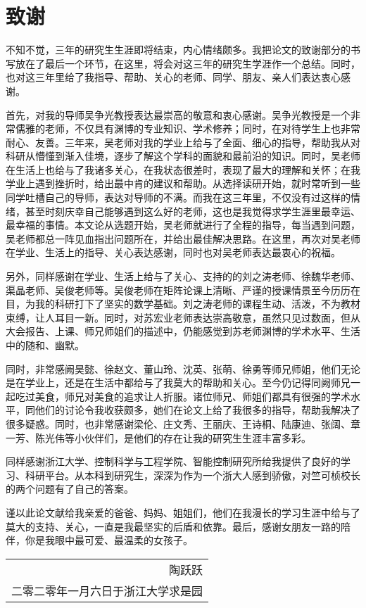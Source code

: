\chapter{致\texorpdfstring{\ZJUspace}{}谢}
	不知不觉，三年的研究生生涯即将结束，内心情绪颇多。我把论文的致谢部分的书写放在了最后一个环节，在这里，将会对这三年的研究生学涯作一个总结。同时，也对这三年里给了我指导、帮助、关心的老师、同学、朋友、亲人们表达衷心感谢。
	
	首先，对我的导师吴争光教授表达最崇高的敬意和衷心感谢。吴争光教授是一个非常儒雅的老师，不仅具有渊博的专业知识、学术修养；同时，在对待学生上也非常耐心、友善。三年来，吴老师对我的学业上给与了全面、细心的指导，帮助我从对科研从懵懂到渐入佳境，逐步了解这个学科的面貌和最前沿的知识。同时，吴老师在生活上也给与了我诸多关心，在我状态很差时，表现了最大的理解和关怀；在我学业上遇到挫折时，给出最中肯的建议和帮助。从选择读研开始，就时常听到一些同学吐槽自己的导师，表达对导师的不满。而我在这三年里，不仅没有过这样的情绪，甚至时刻庆幸自己能够遇到这么好的老师，这也是我觉得求学生涯里最幸运、最幸福的事情。本文论从选题开始，吴老师就进行了全程的指导，每当遇到问题，吴老师都总一阵见血指出问题所在，并给出最佳解决思路。在这里，再次对吴老师在学业、生活上的指导、关心表达感谢，同时也对吴老师表达最衷心的祝福。
	
	另外，同样感谢在学业、生活上给与了关心、支持的的刘之涛老师、徐魏华老师、渠晶老师、吴俊老师等。吴俊老师在矩阵论课上清晰、严谨的授课情景至今历历在目，为我的科研打下了坚实的数学基础。刘之涛老师的课程生动、活泼，不为教材束缚，让人耳目一新。同时，对苏宏业老师表达崇高敬意，虽然只见过数面，但从大会报告、上课、师兄师姐们的描述中，仍能感觉到苏老师渊博的学术水平、生活中的随和、幽默。
	
	同时，非常感阙昊懿、徐赵文、董山玲、沈英、张萌、徐勇等师兄师姐，他们无论是在学业上，还是在生活中都给与了我莫大的帮助和关心。至今仍记得同阙师兄一起吃过美食，师兄对美食的追求让人折服。诸位师兄、师姐们都具有很强的学术水平，同他们的讨论令我收获颇多，她们在论文上给了我很多的指导，帮助我解决了很多疑惑。同时，也非常感谢梁伦、庄文秀、王丽庆、王诗桐、陆康迪、张阔、章一芳、陈光伟等小伙伴们，是他们的存在让我的研究生生涯丰富多彩。
	
	同样感谢浙江大学、控制科学与工程学院、智能控制研究所给我提供了良好的学习、科研平台。从本科到研究生，深深为作为一个浙大人感到骄傲，对竺可桢校长的两个问题有了自己的答案。
	
	谨以此论文献给我亲爱的爸爸、妈妈、姐姐们，他们在我漫长的学习生涯中给与了莫大的支持、关心，一直是我最坚实的后盾和依靠。最后，感谢女朋友一路的陪伴，你是我眼中最可爱、最温柔的女孩子。
	
\hfill
\begin{minipage}{17.4em}
\begin{center}
	\begin{tabular}{r}
		陶跃跃\\
		二零二零年一月六日于浙江大学求是园
	\end{tabular}
\end{center}
\end{minipage}
